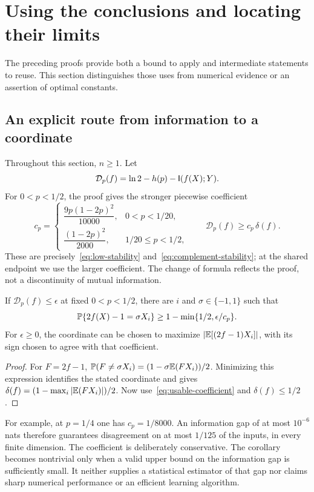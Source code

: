 \section{Using the conclusions and locating their limits}\label{sec:use}
The preceding proofs provide both a bound to apply and intermediate statements to reuse. This section distinguishes those uses from numerical evidence or an assertion of optimal constants.

\subsection{An explicit route from information to a coordinate}
Throughout this section, $n\ge1$. Let
\[
 \mathcal D_p(f)=\ln2-h(p)-\mathsf I(f(X);Y).
\]
For $0<p<1/2$, the proof gives the stronger piecewise coefficient
\begin{equation}\label{eq:usable-coefficient}
 c_p=\begin{cases}
 \dfrac{9p(1-2p)^2}{10000},&0<p<1/20,\\[4pt]
 \dfrac{(1-2p)^2}{2000},&1/20\le p<1/2,
 \end{cases}
 \qquad \mathcal D_p(f)\ge c_p\,\delta(f).
\end{equation}
These are precisely~\eqref{eq:low-stability} and~\eqref{eq:complement-stability}; at the shared endpoint we use the larger coefficient. The change of formula reflects the proof, not a discontinuity of mutual information.

\begin{corollary}\label{cor:recovery}
If $\mathcal D_p(f)\le\epsilon$ at fixed $0<p<1/2$, there are $i$ and $\sigma\in\{-1,1\}$ such that
\begin{equation}\label{eq:recovery}
 \mathbb P\{2f(X)-1=\sigma X_i\}\ge
 1-\min\{1/2,\epsilon/c_p\}.
\end{equation}
For $\epsilon\ge0$, the coordinate can be chosen to maximize $|\mathbb E[(2f-1)X_i]|$, with its sign chosen to agree with that coefficient.
\end{corollary}
\begin{proof}
For $F=2f-1$,
$\mathbb P(F\ne\sigma X_i)=(1-\sigma\mathbb E(FX_i))/2$.
Minimizing this expression identifies the stated coordinate and gives
$\delta(f)=(1-\max_i|\mathbb E(FX_i)|)/2$. Now use~\eqref{eq:usable-coefficient} and $\delta(f)\le1/2$.
\end{proof}

For example, at $p=1/4$ one has $c_p=1/8000$. An information gap of at most $10^{-6}$ nats therefore guarantees disagreement on at most $1/125$ of the inputs, in every finite dimension. The coefficient is deliberately conservative. The corollary becomes nontrivial only when a valid upper bound on the information gap is sufficiently small. It neither supplies a statistical estimator of that gap nor claims sharp numerical performance or an efficient learning algorithm.

